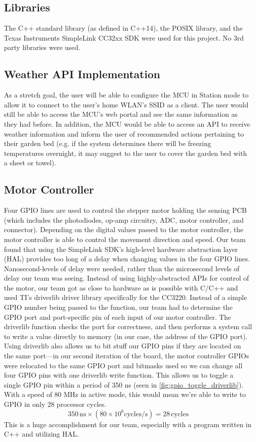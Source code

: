 \documentclass[journal]{IEEEtran}
\begin{document}
\subsection{Libraries}
The C++ standard library (as defined in C++14), the POSIX library, and the Texas Instruments SimpleLink CC32xx SDK were used for this project. No 3rd party libraries were used.

\subsection{Weather API Implementation}
As a stretch goal, the user will be able to configure the MCU in Station mode to allow it to connect to the user's home WLAN's SSID as a client. The user would still be able to access the MCU's web portal and see the same information as they had before. In addition, the MCU would be able to access an API to receive weather information and inform the user of recommended actions pertaining to their garden bed (e.g. if the system determines there will be freezing temperatures overnight, it may suggest to the user to cover the garden bed with a sheet or towel).
\subsection{Motor Controller}
Four GPIO lines are used to control the stepper motor holding the sensing PCB (which includes the photodiodes, op-amp circuitry, ADC, motor controller, and connector). Depending on the digital values passed to the motor controller, the motor controller is able to control the movement direction and speed. Our team found that using the SimpleLink SDK's high-level hardware abstraction layer (HAL) provides too long of a delay when changing values in the four GPIO lines. Nanosecond-levels of delay were needed, rather than the microsecond levels of delay our team was seeing. Instead of using highly-abstracted APIs for control of the motor, our team got as close to hardware as is possible with C/C++ and used TI's driverlib driver library specifically for the CC3220. Instead of a simple GPIO number being passed to the function, our team had to determine the GPIO port and port-specific pin of each input of our motor controller. The driverlib function checks the port for correctness, and then performs a system call to write a value directly to memory (in our case, the address of the GPIO port). Using driverlib also allows us to bit stuff our GPIO pins if they are located on the same port---in our second iteration of the board, the motor controller GPIOs were relocated to the same GPIO port and bitmasks used so we can change all four GPIO pins with one driverlib write function. This allows us to toggle a single GPIO pin within a period of 350 ns (seen in \ref{fig:gpio_toggle_driverlib}). With a speed of 80 MHz in active mode, this would mean we're able to write to GPIO in only 28 processor cycles.
\begin{equation}
	350\,\mathrm{ns} \times (80\times10^6\mathrm{cycles/s}) = 28\,\mathrm{cycles}
\end{equation}
This is a huge accomplishment for our team, especially with a program written in C++ and utilizing HAL.
\end{document}

